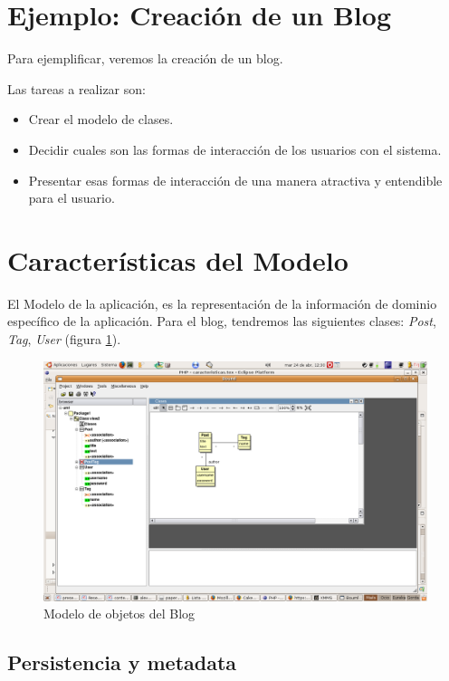 \section{Ejemplo: Creación de un Blog}
Para ejemplificar, veremos la creación de un blog.

Las tareas a realizar son:
\begin{itemize}
\item Crear el modelo de clases.
\item Decidir cuales son las formas de interacción de los usuarios con el sistema.
\item Presentar esas formas de interacción de una manera atractiva y entendible para el usuario.
\end{itemize}

\section{Características del Modelo}

El Modelo de la aplicación, es la representación de la información de dominio específico de la aplicación. Para el blog, tendremos las siguientes clases: \emph{Post}, \emph{Tag}, \emph{User} (figura \ref{fig-model1}).

\begin{figure}
	\centering
	\includegraphics*[scale=0.60,viewport=420 350 700 600]{images/diagrama.png}
 	\caption{Modelo de objetos del Blog}
 	\label{fig-model1}
\end{figure}

\subsection{Persistencia y metadata}
\label{sub-pers}

